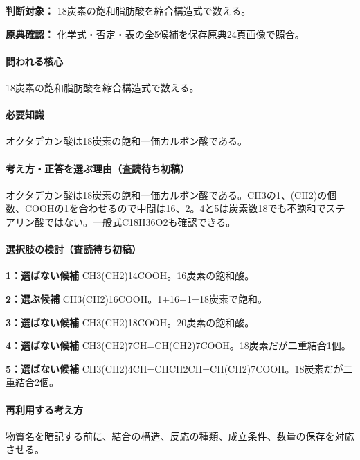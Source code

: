 \noindent\textbf{判断対象：} 18炭素の飽和脂肪酸を縮合構造式で数える。\par

\noindent\textbf{原典確認：} 化学式・否定・表の全5候補を保存原典24頁画像で照合。\par

\paragraph{問われる核心} 18炭素の飽和脂肪酸を縮合構造式で数える。

\paragraph{必要知識} オクタデカン酸は18炭素の飽和一価カルボン酸である。

\paragraph{考え方・正答を選ぶ理由（査読待ち初稿）} オクタデカン酸は18炭素の飽和一価カルボン酸である。CH3の1、(CH2)の個数、COOHの1を合わせるので中間は16、2。4と5は炭素数18でも不飽和でステアリン酸ではない。一般式C18H36O2も確認できる。

\paragraph{選択肢の検討（査読待ち初稿）}\mbox{}\par

\noindent\textbf{1：選ばない候補} CH3(CH2)14COOH。16炭素の飽和酸。\par

\noindent\textbf{2：選ぶ候補} CH3(CH2)16COOH。1+16+1=\allowbreak{}18炭素で飽和。\par

\noindent\textbf{3：選ばない候補} CH3(CH2)18COOH。20炭素の飽和酸。\par

\noindent\textbf{4：選ばない候補} CH3(CH2)7CH=\allowbreak{}CH(CH2)7COOH。18炭素だが二重結合1個。\par

\noindent\textbf{5：選ばない候補} CH3(CH2)4CH=\allowbreak{}CHCH2CH=\allowbreak{}CH(CH2)7COOH。18炭素だが二重結合2個。\par

\paragraph{再利用する考え方} 物質名を暗記する前に、結合の構造、反応の種類、成立条件、数量の保存を対応させる。

